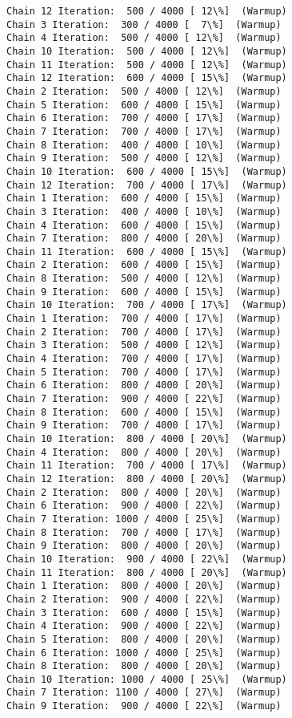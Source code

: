 \documentclass[11pt]{article}
\begin{document}
\begin{Verbatim}[commandchars=\\\{\}]
Chain 12 Iteration:  500 / 4000 [ 12\%]  (Warmup)
Chain 3 Iteration:  300 / 4000 [  7\%]  (Warmup)
Chain 4 Iteration:  500 / 4000 [ 12\%]  (Warmup)
Chain 10 Iteration:  500 / 4000 [ 12\%]  (Warmup)
Chain 11 Iteration:  500 / 4000 [ 12\%]  (Warmup)
Chain 12 Iteration:  600 / 4000 [ 15\%]  (Warmup)
Chain 2 Iteration:  500 / 4000 [ 12\%]  (Warmup)
Chain 5 Iteration:  600 / 4000 [ 15\%]  (Warmup)
Chain 6 Iteration:  700 / 4000 [ 17\%]  (Warmup)
Chain 7 Iteration:  700 / 4000 [ 17\%]  (Warmup)
Chain 8 Iteration:  400 / 4000 [ 10\%]  (Warmup)
Chain 9 Iteration:  500 / 4000 [ 12\%]  (Warmup)
Chain 10 Iteration:  600 / 4000 [ 15\%]  (Warmup)
Chain 12 Iteration:  700 / 4000 [ 17\%]  (Warmup)
Chain 1 Iteration:  600 / 4000 [ 15\%]  (Warmup)
Chain 3 Iteration:  400 / 4000 [ 10\%]  (Warmup)
Chain 4 Iteration:  600 / 4000 [ 15\%]  (Warmup)
Chain 7 Iteration:  800 / 4000 [ 20\%]  (Warmup)
Chain 11 Iteration:  600 / 4000 [ 15\%]  (Warmup)
Chain 2 Iteration:  600 / 4000 [ 15\%]  (Warmup)
Chain 8 Iteration:  500 / 4000 [ 12\%]  (Warmup)
Chain 9 Iteration:  600 / 4000 [ 15\%]  (Warmup)
Chain 10 Iteration:  700 / 4000 [ 17\%]  (Warmup)
Chain 1 Iteration:  700 / 4000 [ 17\%]  (Warmup)
Chain 2 Iteration:  700 / 4000 [ 17\%]  (Warmup)
Chain 3 Iteration:  500 / 4000 [ 12\%]  (Warmup)
Chain 4 Iteration:  700 / 4000 [ 17\%]  (Warmup)
Chain 5 Iteration:  700 / 4000 [ 17\%]  (Warmup)
Chain 6 Iteration:  800 / 4000 [ 20\%]  (Warmup)
Chain 7 Iteration:  900 / 4000 [ 22\%]  (Warmup)
Chain 8 Iteration:  600 / 4000 [ 15\%]  (Warmup)
Chain 9 Iteration:  700 / 4000 [ 17\%]  (Warmup)
Chain 10 Iteration:  800 / 4000 [ 20\%]  (Warmup)
Chain 4 Iteration:  800 / 4000 [ 20\%]  (Warmup)
Chain 11 Iteration:  700 / 4000 [ 17\%]  (Warmup)
Chain 12 Iteration:  800 / 4000 [ 20\%]  (Warmup)
Chain 2 Iteration:  800 / 4000 [ 20\%]  (Warmup)
Chain 6 Iteration:  900 / 4000 [ 22\%]  (Warmup)
Chain 7 Iteration: 1000 / 4000 [ 25\%]  (Warmup)
Chain 8 Iteration:  700 / 4000 [ 17\%]  (Warmup)
Chain 9 Iteration:  800 / 4000 [ 20\%]  (Warmup)
Chain 10 Iteration:  900 / 4000 [ 22\%]  (Warmup)
Chain 11 Iteration:  800 / 4000 [ 20\%]  (Warmup)
Chain 1 Iteration:  800 / 4000 [ 20\%]  (Warmup)
Chain 2 Iteration:  900 / 4000 [ 22\%]  (Warmup)
Chain 3 Iteration:  600 / 4000 [ 15\%]  (Warmup)
Chain 4 Iteration:  900 / 4000 [ 22\%]  (Warmup)
Chain 5 Iteration:  800 / 4000 [ 20\%]  (Warmup)
Chain 6 Iteration: 1000 / 4000 [ 25\%]  (Warmup)
Chain 8 Iteration:  800 / 4000 [ 20\%]  (Warmup)
Chain 10 Iteration: 1000 / 4000 [ 25\%]  (Warmup)
Chain 7 Iteration: 1100 / 4000 [ 27\%]  (Warmup)
Chain 9 Iteration:  900 / 4000 [ 22\%]  (Warmup)

\end{Verbatim}
\end{document}
